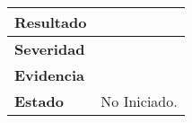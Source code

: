 \begin{longtable}{|l|l|}
\textbf{Resultado}                                                                      &                                                                                                                                                                                                                                                                                                                               \\ \hline
\textbf{Severidad}                                                                      &                                                                                                                                                                                                                                                                                                                               \\ \hline
\textbf{Evidencia}                                                                      &                                                                                                                                                                                                                                                                                                                               \\ \hline
\textbf{Estado}                                                                         & No Iniciado.                                                                                                                                                                                                                                                                                                                  \\ \hline
\end{longtable}